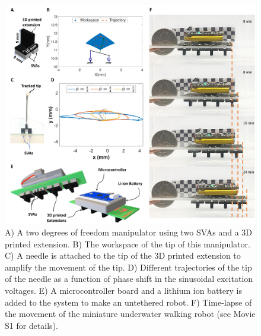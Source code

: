 \begin{figure}[!t]
      \centering
      \includegraphics[width=1\textwidth]{untethered_podia.pdf}
      \caption[]{A) A two degrees of freedom manipulator using two SVAs and a 3D printed extension. B) The workspace of the tip of this manipulator. C) A needle is attached to the tip of the 3D printed extension to amplify the movement of the tip. D) Different trajectories of the tip of the needle as a function of phase shift in the sinusoidal excitation voltages. E) A microcontroller board and a lithium ion battery is added to the system to make an untethered robot. F) Time-lapse of the movement of the miniature underwater walking robot (see Movie S1 for details).}
      \label{fig:untethered_podia}
\end{figure}

